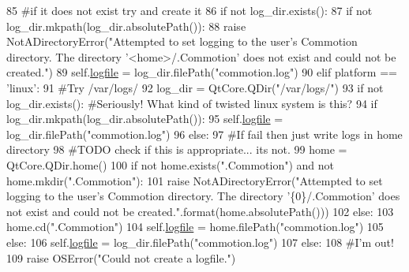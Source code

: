 \begin{DoxyCode}
85             \textcolor{comment}{#if it does not exist try and create it}
86             \textcolor{keywordflow}{if} \textcolor{keywordflow}{not} log\_dir.exists():
87                 \textcolor{keywordflow}{if} \textcolor{keywordflow}{not} log\_dir.mkpath(log\_dir.absolutePath()):
88                     \textcolor{keywordflow}{raise} NotADirectoryError(\textcolor{stringliteral}{"Attempted to set logging to the user's Commotion directory.
       The directory '<home>/.Commotion' does not exist and could not be created."})
89             self.\hyperlink{classcommotion__client_1_1utils_1_1logger_1_1LogHandler_a92d313ddde96b6e1765514f4596f26f2}{logfile} = log\_dir.filePath(\textcolor{stringliteral}{"commotion.log"})
90         \textcolor{keywordflow}{elif} platform == \textcolor{stringliteral}{'linux'}:
91             \textcolor{comment}{#Try /var/logs/}
92             log\_dir = QtCore.QDir(\textcolor{stringliteral}{"/var/logs/"})
93             \textcolor{keywordflow}{if} \textcolor{keywordflow}{not} log\_dir.exists(): \textcolor{comment}{#Seriously! What kind of twisted linux system is this?}
94                 \textcolor{keywordflow}{if} log\_dir.mkpath(log\_dir.absolutePath()):
95                     self.\hyperlink{classcommotion__client_1_1utils_1_1logger_1_1LogHandler_a92d313ddde96b6e1765514f4596f26f2}{logfile} = log\_dir.filePath(\textcolor{stringliteral}{"commotion.log"})
96                 \textcolor{keywordflow}{else}:
97                     \textcolor{comment}{#If fail then just write logs in home directory}
98                     \textcolor{comment}{#TODO check if this is appropriate... its not.}
99                     home = QtCore.QDir.home()
100                     \textcolor{keywordflow}{if} \textcolor{keywordflow}{not} home.exists(\textcolor{stringliteral}{".Commotion"}) \textcolor{keywordflow}{and} \textcolor{keywordflow}{not} home.mkdir(\textcolor{stringliteral}{".Commotion"}):
101                         \textcolor{keywordflow}{raise} NotADirectoryError(\textcolor{stringliteral}{"Attempted to set logging to the user's Commotion
       directory. The directory '\{0\}/.Commotion' does not exist and could not be created."}.format(home.absolutePath()))
102                     \textcolor{keywordflow}{else}:
103                         home.cd(\textcolor{stringliteral}{".Commotion"})
104                         self.\hyperlink{classcommotion__client_1_1utils_1_1logger_1_1LogHandler_a92d313ddde96b6e1765514f4596f26f2}{logfile} = home.filePath(\textcolor{stringliteral}{"commotion.log"})
105             \textcolor{keywordflow}{else}:
106                 self.\hyperlink{classcommotion__client_1_1utils_1_1logger_1_1LogHandler_a92d313ddde96b6e1765514f4596f26f2}{logfile} = log\_dir.filePath(\textcolor{stringliteral}{"commotion.log"})
107         \textcolor{keywordflow}{else}:
108             \textcolor{comment}{#I'm out!}
109             \textcolor{keywordflow}{raise} OSError(\textcolor{stringliteral}{"Could not create a logfile."})

\end{DoxyCode}
